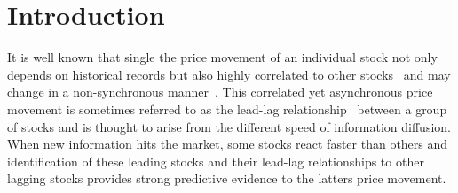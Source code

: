 
\chapter{Introduction}
\label{cha:intro}



It is well known that single the price movement of an individual
stock not only depends on historical records but also highly
correlated to other
stocks~\cite{lo1990contrarian,mech1993portfolio} and may change
in a non-synchronous
manner~\cite{lo1990contrarian,brennan1993investment}. This
correlated yet asynchronous price movement is sometimes referred
to as the lead-lag relationship~\cite{hou2007industry} between a
group of stocks and is thought to arise from the different speed
of information
diffusion\cite{lo1990contrarian,badrinath1995shepherds,mcqueen1996delayed}.
When new information hits the market, some stocks react faster
than others and identification of these leading stocks and their
lead-lag relationships to other lagging stocks provides strong
predictive evidence to the latter\textquotesingle s price
movement.


